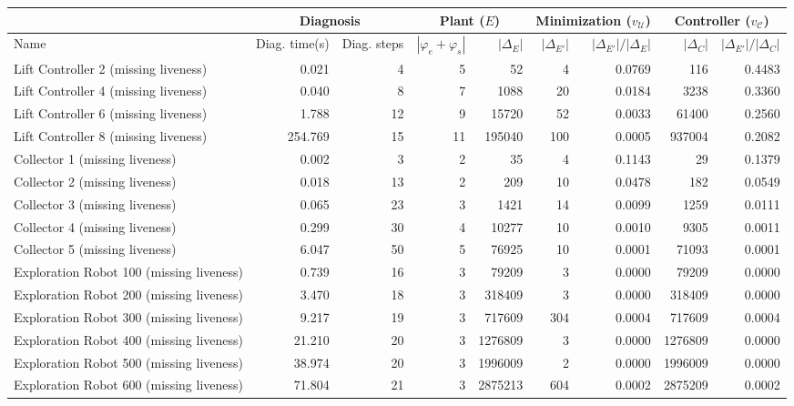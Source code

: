 \begin{tabular}{|l|rr|rr|rr|rr|}
  \hline & \multicolumn{2}{c|}{Diagnosis}&\multicolumn{2}{c|}{Plant ($E$)} & \multicolumn{2}{c|}{Minimization ($v_{\mathcal{U}}$)} & \multicolumn{2}{c|}{Controller ($v_{\mathcal{C}}$)}\\ \hline
Name & Diag. time(s) & Diag. steps & $|\varphi_e + \varphi_s|$ & $|\Delta_E|$ & $|\Delta_{E'}|$ & $|\Delta_{E'}|/|\Delta_{E}|$ & $|\Delta_{C}|$ & $|\Delta_{E'}|/|\Delta_{C}|$ \\ 
  \hline
Lift Controller 2 (missing liveness) & 0.021 & 4 & 5 & 52 & 4 & 0.0769 & 116 & 0.4483 \\ 
  Lift Controller 4 (missing liveness) & 0.040 & 8 & 7 & 1088 & 20 & 0.0184 & 3238 & 0.3360 \\ 
  Lift Controller 6 (missing liveness) & 1.788 & 12 & 9 & 15720 & 52 & 0.0033 & 61400 & 0.2560 \\ 
  Lift Controller 8 (missing liveness) & 254.769 & 15 & 11 & 195040 & 100 & 0.0005 & 937004 & 0.2082 \\ 
  Collector 1 (missing liveness) & 0.002 & 3 & 2 & 35 & 4 & 0.1143 & 29 & 0.1379 \\ 
  Collector 2 (missing liveness) & 0.018 & 13 & 2 & 209 & 10 & 0.0478 & 182 & 0.0549 \\ 
  Collector 3 (missing liveness) & 0.065 & 23 & 3 & 1421 & 14 & 0.0099 & 1259 & 0.0111 \\ 
  Collector 4 (missing liveness) & 0.299 & 30 & 4 & 10277 & 10 & 0.0010 & 9305 & 0.0011 \\ 
  Collector 5 (missing liveness) & 6.047 & 50 & 5 & 76925 & 10 & 0.0001 & 71093 & 0.0001 \\ 
  Exploration Robot 100 (missing liveness) & 0.739 & 16 & 3 & 79209 & 3 & 0.0000 & 79209 & 0.0000 \\ 
  Exploration Robot 200 (missing liveness) & 3.470 & 18 & 3 & 318409 & 3 & 0.0000 & 318409 & 0.0000 \\ 
  Exploration Robot 300 (missing liveness) & 9.217 & 19 & 3 & 717609 & 304 & 0.0004 & 717609 & 0.0004 \\ 
  Exploration Robot 400 (missing liveness) & 21.210 & 20 & 3 & 1276809 & 3 & 0.0000 & 1276809 & 0.0000 \\ 
  Exploration Robot 500 (missing liveness) & 38.974 & 20 & 3 & 1996009 & 2 & 0.0000 & 1996009 & 0.0000 \\ 
  Exploration Robot 600 (missing liveness) & 71.804 & 21 & 3 & 2875213 & 604 & 0.0002 & 2875209 & 0.0002 \\ 

\end{tabular}
